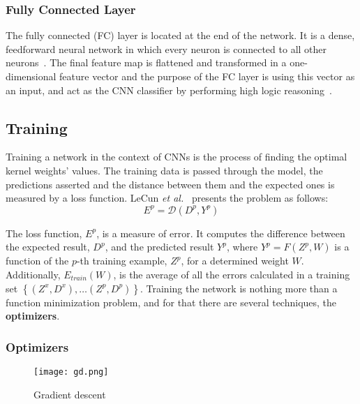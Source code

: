 \documentclass[class=report, crop=false, a4paper, 12pt]{standalone}
\begin{document}
\subsubsection{Fully Connected Layer}
The fully connected (FC) layer is located at the end of the network. It is a dense, feedforward neural network in which every neuron is connected to all other neurons~\autocite{yamashitaConvolutionalNeuralNetworks2018, alzubaidiReviewDeepLearning2021}. The final feature map is flattened and transformed in a one-dimensional feature vector and the purpose of the FC layer is using this vector as an input, and act as the CNN classifier by performing high logic reasoning~\autocite{guRecentAdvancesConvolutional2018}.

\subsection{Training}
Training a network in the context of CNNs is the process of finding the optimal kernel weights' values. The training data is passed through the model, the predictions asserted and the distance between them and the expected ones is measured by a loss function. LeCun \textit{et al.}~\autocite{lecunGradientBasedLearningApplied1998} presents the problem as follows:
$$
E^p = \mathcal{D}(D^p, Y^p)
$$

\noindent The loss function, $E^p$, is a measure of error. It computes the difference between the expected result, $D^p$, and the predicted result $Y^p$, where $Y^p = F(Z^p, W)$ is a function of the $p$-th training example, $Z^p$, for a determined weight $W$. Additionally, $E_{train}(W)$, is the average of all the errors calculated in a training set $\left\{(Z^x, D^x),\dots (Z^p, D^p)\right\}$. Training the network is nothing more than a function minimization problem, and for that there are several techniques, the \textbf{optimizers}.

\subsubsection{Optimizers}

\begin{figure}[!h]
    \centering
    \texttt{[image: gd.png]} %
    \caption{Gradient descent}
    \label{fig:gd}
\end{figure}
\end{document}
